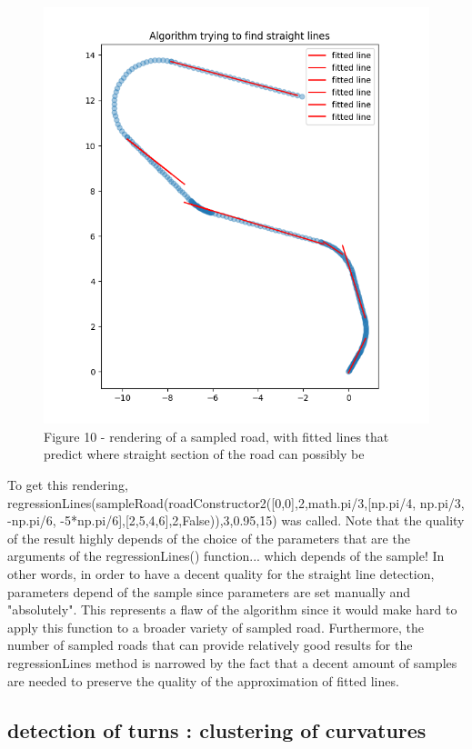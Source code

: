 \documentclass[a4paper,12pt,fleqn]{article}
\begin{document}
\begin{figure}[H]
\centering
\includegraphics[width=\textwidth]{regressionLine}
Figure 10 - rendering of a sampled road, with fitted lines that predict where straight section of the road can possibly be
\end{figure}
To get this rendering, regressionLines(sampleRoad(roadConstructor2([0,0],2,math.pi/3,[np.pi/4, np.pi/3, -np.pi/6, -5*np.pi/6],[2,5,4,6],2,False)),3,0.95,15) was called. Note that the quality of the result highly depends of the choice of the parameters that are the arguments of the regressionLines() function... which depends of the sample! In other words, in order to have a decent quality for the straight line detection, parameters depend of the sample since parameters are set manually and "absolutely". This represents a flaw of the algorithm since it would make hard to apply this function to a broader variety of sampled road. Furthermore, the number of sampled roads that can provide relatively good results for the regressionLines method is narrowed by the fact that a decent amount of samples are needed to preserve the quality of the approximation of fitted lines.

\subsection{detection of turns : clustering of curvatures}
\end{document}
